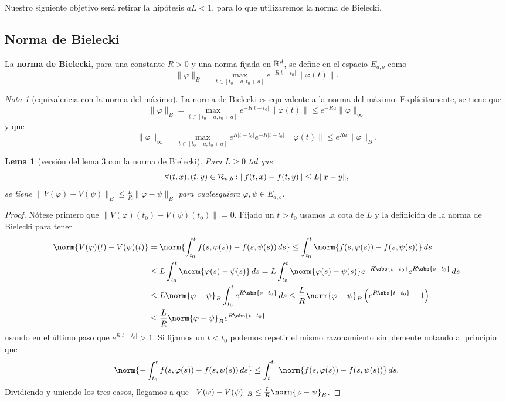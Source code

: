 \documentclass[11pt]{article}
\theoremstyle{plain}
\newtheorem{lemma}{Lema}
\theoremstyle{definition}
\theoremstyle{remark}
\newtheorem{remark}{Nota}
\begin{document}
Nuestro siguiente objetivo será retirar la hipótesis $aL < 1$, para lo que
utilizaremos la norma de Bielecki.

\subsection{Norma de Bielecki}

La \textbf{norma de Bielecki}, para una constante \(R > 0\) y una norma fijada
en $\mathbb{R}^d$, se define en el espacio \(E_{a,b}\) como
\[\|\varphi\|_B = \max_{t \in [t_0-a,t_0+a]} e^{-R|t-t_0|}\|\varphi(t)\|.\]

\begin{remark}[equivalencia con la norma del máximo]
  La norma de Bielecki es equivalente a la norma del máximo. Explícitamente,
  se tiene que
  \[
    \|\varphi\|_B = \max_{t \in [t_0-a,t_0+a]} e^{-R|t-t_0|} \|\varphi(t)\| \leq
     e^{-Ra} \|\varphi\|_\infty
   \]
  y que
  \[
   \|\varphi\|_\infty =  \max_{t \in [t_0-a,t_0+a]} e^{R|t-t_0|}e^{-R|t-t_0|} \|\varphi(t)\| \leq
   e^{Ra}\|\varphi\|_B.
  \]
\end{remark}

\begin{lemma}[versión del lema 3 con la norma de Bielecki]\label{lema-4-contr}
  Para \(L \geq 0\) tal que
  \[
    \forall (t,x),(t,y) \in {{\cal{R}}}_{a,b} : \| f(t,x) - f(t,y) \| \leq L\|x-y\|,
  \]
  se tiene \(\|V(\varphi)-V(\psi)\|_B \leq \frac{L}{R} \|\varphi - \psi\|_B\)
  para cualesquiera $\varphi,\psi \in E_{a,b}$.
\end{lemma}
\begin{proof}
Nótese primero que $\|V(\varphi)(t_0) - V(\psi)(t_0)\| = 0$. Fijado un $t > t_0$
usamos la cota de $L$ y la definición de la norma de Bielecki para tener
\[\begin{aligned}
\norm{V(\varphi)(t) - V(\psi)(t)} &=
\norm{\int_{t_0}^t f(s,\varphi(s)) - f(s,\psi(s))\,ds} \leq
\int_{t_0}^t \norm{f(s,\varphi(s)) - f(s,\psi(s))}\,ds \\&\leq
L \int_{t_0}^t \norm{\varphi(s) - \psi(s)}\,ds =
L \int_{t_0}^t \norm{\varphi(s) - \psi(s)} e^{-R\abs{s-t_0}}e^{R\abs{s-t_0}}\, ds \\&\leq
L \norm{\varphi - \psi}_{B} \int_{t_0}^t e^{R\abs{s-t_0}}\,ds \leq
\frac{L}{R} \norm{\varphi - \psi}_{B} \left(e^{R\abs{t-t_0}} - 1\right) \\&\leq
\frac{L}{R} \norm{\varphi - \psi}_{B} e^{R\abs{t-t_0}}
\end{aligned}\]
usando en el último paso que $e^{R|t-t_0|} > 1$. Si fijamos un $t < t_0$
podemos repetir el mismo razonamiento simplemente notando al principio que
\[
\norm{- \int_{t_0}^t f(s,\varphi(s)) - f(s,\psi(s))\,ds} \leq
\int_{t}^{t_0} \norm{f(s,\varphi(s)) - f(s,\psi(s))}\,ds.
\]
Dividiendo y uniendo los tres casos, llegamos a que
$\|V(\varphi) - V(\psi)\|_{B} \leq \frac{L}{R} \norm{\varphi - \psi}_{B}$.
\end{proof}
\end{document}
